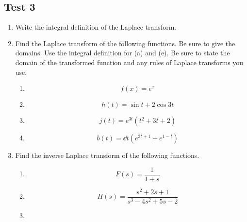 \subsection{Test 3}

\begin{enumerate}[label=\arabic*.]
	\item
		Write the integral definition of the Laplace transform.
	\item 
		Find the Laplace transform of the following functions. Be sure to give the domains. Use the integral definition for (a) and (e). Be sure to state the domain of the transformed function and any rules of Laplace transforms you use.
		\begin{enumerate}[label = (\alph*)]
			\item
				\begin{equation*}
					f(x) = e^x
				\end{equation*}
			\item
				\begin{equation*}
					h(t) = \sin{t} + 2\cos{3t}
				\end{equation*}
			\item
				\begin{equation*}
					j(t) = e^{3t}\left(t^2 + 3t + 2\right)
				\end{equation*}
			\item
				\begin{equation*}
					b(t) = \dd{}{t}{(e^{3t+1} + e^{1-t})}
				\end{equation*}
		\end{enumerate}
	\item
		Find the inverse Laplace transform of the following functions.
		\begin{enumerate}[label=(\alph*)]
			\item
				\begin{equation*}
					F(s) = \frac{1}{1+s}
				\end{equation*}
			\item
				\begin{equation*}
					H(s) = \frac{s^2+2s+1}{s^3 - 4s^2 + 5s - 2}					
				\end{equation*}
			\item
				\begin{equation*}

\end{equation*}
\end{enumerate}
\end{enumerate}
